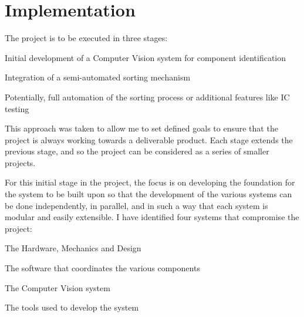 \section{Implementation}
The project is to be executed in three stages:
\begin{mylist}
  \item Initial development of a Computer Vision system for component identification
  \item Integration of a semi-automated sorting mechanism
  \item Potentially, full automation of the sorting process or additional features like IC testing
\end{mylist}
This approach was taken to allow me to set defined goals to ensure that the project is always working towards a deliverable product.
Each stage extends the previous stage, and so the project can be considered as a series of smaller projects. 

For this initial stage in the project, the focus is on developing the foundation for the system to be built upon so that
the development of the various systems can be done independently, in parallel, and in such a way that each system
is modular and easily extensible.
I have identified four systems that compromise the project:
\begin{mylist}
  \item The Hardware, Mechanics and Design
  \item The software that coordinates the various components
  \item The Computer Vision system
  \item The tools used to develop the system
\end{mylist}







